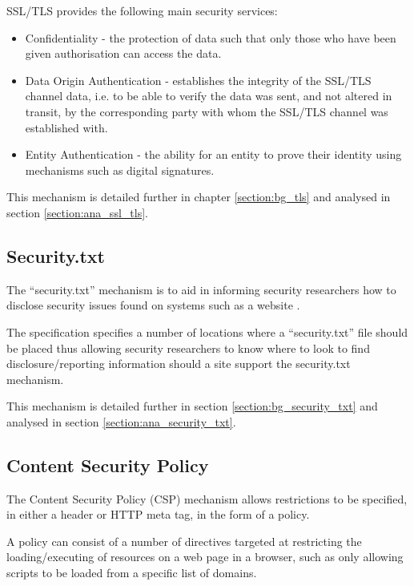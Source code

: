 \documentclass{mscreport}
\begin{document}
\vspace{0.3cm} \noindent
SSL/TLS provides the following main security services:

\begin{itemize}
	\setlength\itemsep{0.1em}
	\item Confidentiality - the protection of data such that only those who have been given authorisation can access the data.
	\item Data Origin Authentication - establishes the integrity of the SSL/TLS channel data, i.e. to be able to verify the data was sent, and not altered in transit, by the corresponding party with whom the SSL/TLS channel was established with.
	\item Entity Authentication - the ability for an entity to prove their identity using mechanisms such as digital signatures.
\end{itemize}

\noindent
This mechanism is detailed further in chapter \ref{section:bg_tls} and analysed in section \ref{section:ana_ssl_tls}.


\subsection{Security.txt}
The ``security.txt'' mechanism is to aid in informing security researchers how to disclose security issues found on systems such as a website \cite{Foudil2021-vh}.

\vspace{0.3cm} \noindent
The specification specifies a number of locations where a ``security.txt'' file should be placed thus allowing security researchers to know where to look to find disclosure/reporting information should a site support the security.txt mechanism.

\vspace{0.3cm} \noindent
This mechanism is detailed further in section \ref{section:bg_security_txt} and analysed in section \ref{section:ana_security_txt}.


\subsection{Content Security Policy}
The Content Security Policy (CSP) mechanism allows restrictions to be specified, in either a header or HTTP meta tag, in the form of a policy.

\vspace{0.3cm} \noindent
A policy can consist of a number of directives targeted at restricting the loading/executing of resources on a web page in a browser, such as only allowing scripts to be loaded from a specific list of domains.
\end{document}
